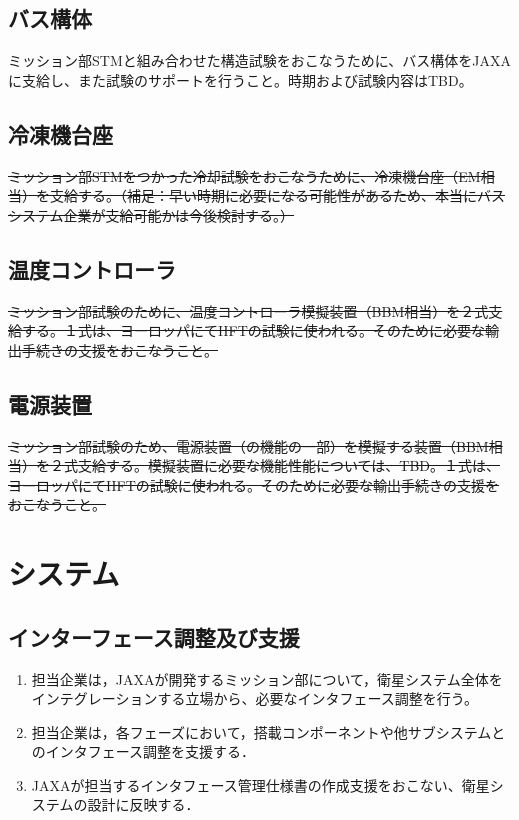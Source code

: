 \documentclass[xelatex,ja=standard]{bxjsarticle}
\begin{document}
\subsection{バス構体}
ミッション部STMと組み合わせた構造試験をおこなうために、バス構体をJAXAに支給し、また試験のサポートを行うこと。時期および試験内容はTBD。

\subsection{冷凍機台座}
\sout{ミッション部STMをつかった冷却試験をおこなうために、冷凍機台座（EM相当）を支給する。（補足：早い時期に必要になる可能性があるため、本当にバスシステム企業が支給可能かは今後検討する。）}

\subsection{温度コントローラ}
\sout{ミッション部試験のために、温度コントローラ模擬装置（BBM相当）を２式支給する。１式は、ヨーロッパにてHFTの試験に使われる。そのために必要な輸出手続きの支援をおこなうこと。}

\subsection{電源装置}
\sout{ミッション部試験のため、電源装置（の機能の一部）を模擬する装置（BBM相当）を２式支給する。模擬装置に必要な機能性能については、TBD。１式は、ヨーロッパにてHFTの試験に使われる。そのために必要な輸出手続きの支援をおこなうこと。}

\section{システム}

\subsection{インターフェース調整及び支援}

\begin{enumerate}
    \item 担当企業は，JAXAが開発するミッション部について，衛星システム全体をインテグレーションする立場から、必要なインタフェース調整を行う。
　　\item 担当企業は，各フェーズにおいて，搭載コンポーネントや他サブシステムとのインタフェース調整を支援する．
　　\item JAXAが担当するインタフェース管理仕様書の作成支援をおこない、衛星システムの設計に反映する．
\end{enumerate}	
\end{document}
